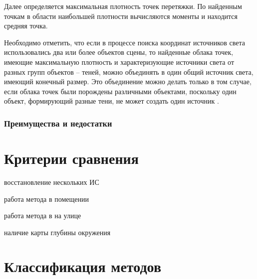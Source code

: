 Далее определяется максимальная плотность точек перетяжки. По найденным точкам в области наибольшей плотности вычисляются моменты и находится средняя точка.

Необходимо отметить, что если в процессе поиска координат источников света использовались два или более объектов сцены, то найденные облака точек, имеющие максимальную плотность и характеризующие источники света от разных групп объектов – теней, можно объединять в один общий источник света, имеющий конечный размер. Это объединение можно делать только в том случае, если облака точек были порождены различными объектами, поскольку один объект, формирующий разные тени, не может создать один источник \cite{sns_tras}.

\subsubsection*{Преимущества и недостатки}

\section{Критерии сравнения}

восстановление нескольких ИС

работа метода в помещении

работа метода в на улице

наличие карты глубины окружения

\section{Классификация методов}